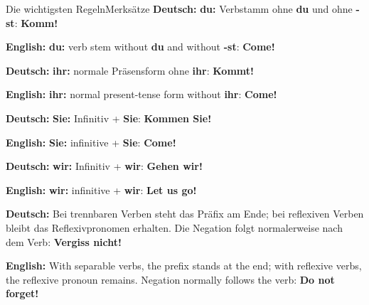 \documentclass[a4paper,11pt]{article}
\newcommand{\GermanText}[1]{\textbf{Deutsch: }#1\par}
\newcommand{\EnglishText}[1]{{\small\color{SoftGray}\textbf{English: }#1\par}}
\begin{document}
        \begin{grammarentry}{Die wichtigsten Regeln}{Merksätze}
            \GermanText{\textbf{du:} Verbstamm ohne \textbf{du} und ohne \textbf{-st}: \textbf{Komm!}}
            \EnglishText{\textbf{du:} verb stem without \textbf{du} and without \textbf{-st}: \textbf{Come!}}

            \GermanText{\textbf{ihr:} normale Präsensform ohne \textbf{ihr}: \textbf{Kommt!}}
            \EnglishText{\textbf{ihr:} normal present-tense form without \textbf{ihr}: \textbf{Come!}}

            \GermanText{\textbf{Sie:} Infinitiv + \textbf{Sie}: \textbf{Kommen Sie!}}
            \EnglishText{\textbf{Sie:} infinitive + \textbf{Sie}: \textbf{Come!}}

            \GermanText{\textbf{wir:} Infinitiv + \textbf{wir}: \textbf{Gehen wir!}}
            \EnglishText{\textbf{wir:} infinitive + \textbf{wir}: \textbf{Let us go!}}

            \GermanText{Bei trennbaren Verben steht das Präfix am Ende; bei reflexiven Verben bleibt das Reflexivpronomen erhalten. Die Negation folgt normalerweise nach dem Verb: \textbf{Vergiss nicht!}}
            \EnglishText{With separable verbs, the prefix stands at the end; with reflexive verbs, the reflexive pronoun remains. Negation normally follows the verb: \textbf{Do not forget!}}
        \end{grammarentry}
\end{document}

